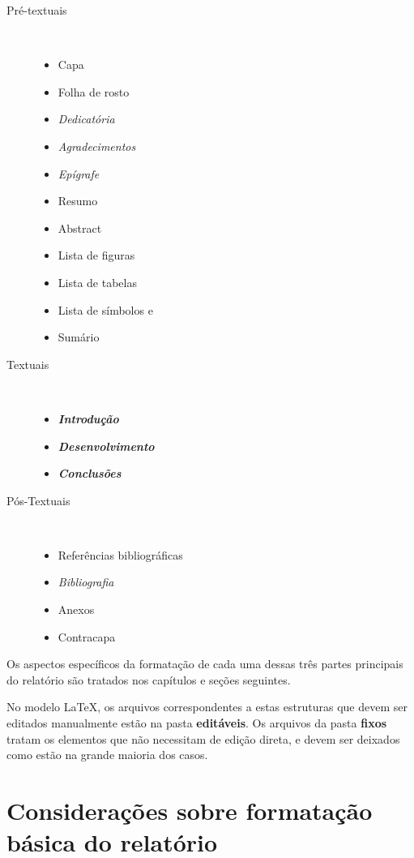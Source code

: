 \begin{description}
	\item [Pré-textuais] \

	\begin{itemize}
		\item Capa
		\item Folha de rosto
		\item \textit{Dedicatória}
		\item \textit{Agradecimentos}
		\item \textit{Epígrafe}
		\item Resumo
		\item Abstract
		\item Lista de figuras
		\item Lista de tabelas
		\item Lista de símbolos e
		\item Sumário
	\end{itemize}

	\item [Textuais] \

	\begin{itemize}
		\item \textbf{\textit{Introdução}}
		\item \textbf{\textit{Desenvolvimento}}
		\item \textbf{\textit{Conclusões}}
	\end{itemize}

	\item [Pós-Textuais] \
	
	\begin{itemize}
		\item Referências bibliográficas
		\item \textit{Bibliografia}
		\item Anexos
		\item Contracapa
	\end{itemize}
\end{description}

Os aspectos específicos da formatação de cada uma dessas três partes 
principais do relatório são tratados nos capítulos e seções seguintes.

No modelo \LaTeX, os arquivos correspondentes a estas estruturas que devem
ser editados manualmente estão na pasta \textbf{editáveis}. Os arquivos
da pasta \textbf{fixos} tratam os elementos que não necessitam de 
edição direta, e devem ser deixados como estão na grande maioria dos casos.

\section{Considerações sobre formatação básica do relatório}

